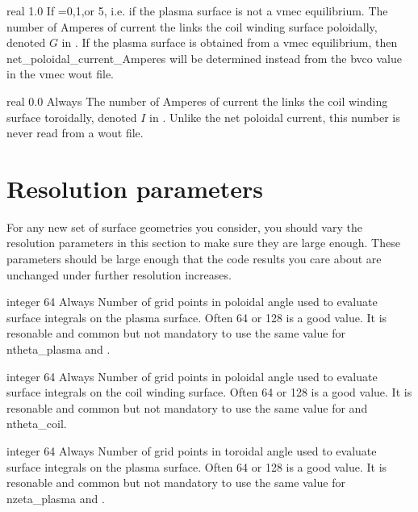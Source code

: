 {real}
{1.0}
{If =0,1,or 5, i.e. if the plasma surface is not a vmec equilibrium.}
{The number of Amperes of current the links the coil winding surface poloidally,
denoted $G$ in \cite{regcoilPaper}. If the plasma surface is obtained from a vmec equilibrium,
then {\ttfamily net\_poloidal\_current\_Amperes} will be determined instead
from the {\ttfamily bvco} value in the vmec wout file.
}

\myhrule

{real}
{0.0}
{Always}
{The number of Amperes of current the links the coil winding surface toroidally,
denoted $I$ in \cite{regcoilPaper}. Unlike the net poloidal current, this number
is never read from a wout file.
}



\section{Resolution parameters}

For any new set of surface geometries you consider, you should vary the resolution parameters in this section to make sure
they are large enough.  These parameters should be large enough that the code results you care about are unchanged under further
resolution increases.

\myhrule

{integer}
{64}
{Always}
{Number of grid points in poloidal angle used to evaluate surface integrals on the plasma surface.
Often 64 or 128 is a good value.
It is resonable and common but not mandatory to use the same value for {\ttfamily ntheta\_plasma} and .}

\myhrule

{integer}
{64}
{Always}
{Number of grid points in poloidal angle used to evaluate surface integrals on the coil winding surface.
Often 64 or 128 is a good value.
It is resonable and common but not mandatory to use the same value for  and {\ttfamily ntheta\_coil}.}

\myhrule


{integer}
{64}
{Always}
{Number of grid points in toroidal angle used to evaluate surface integrals on the plasma surface.
Often 64 or 128 is a good value.
It is resonable and common but not mandatory to use the same value for {\ttfamily nzeta\_plasma} and .}

